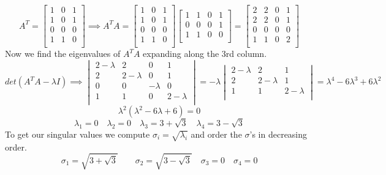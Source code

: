 \documentclass{article}
\begin{document}
$$A^T
=
\begin{bmatrix}
1 & 0 & 1 \\
1 & 0 & 1 \\
0 & 0 & 0 \\
1 & 1 & 0 \\
\end{bmatrix}
\implies
A^TA
=
\begin{bmatrix}
1 & 0 & 1 \\
1 & 0 & 1 \\
0 & 0 & 0 \\
1 & 1 & 0 \\
\end{bmatrix}
\begin{bmatrix}
1 & 1 & 0 & 1 \\
0 & 0 & 0 & 1 \\
1 & 1 & 0 & 0 \\
\end{bmatrix}
=
\begin{bmatrix}
2 & 2 & 0 & 1 \\
2 & 2 & 0 & 1 \\
0 & 0 & 0 & 0 \\
1 & 1 & 0 & 2 \\
\end{bmatrix}
$$
Now we find the eigenvalues of $A^TA$ expanding along the 3rd column.
$$
det(A^TA - \lambda I)
\implies
\begin{vmatrix}
2 -\lambda & 2 & 0 & 1 \\
2 & 2 -\lambda & 0 & 1 \\
0 & 0 &  -\lambda & 0 \\
1 & 1 & 0 & 2 -\lambda \\
\end{vmatrix}
=-\lambda
\begin{vmatrix}
2 -\lambda & 2 & 1 \\
2 & 2 -\lambda & 1 \\
1 & 1 & 2 -\lambda \\
\end{vmatrix}
=\lambda ^4-6 \lambda ^3+6 \lambda ^2
$$
$$
\lambda^2 (\lambda ^2 - 6\lambda + 6) = 0
$$
$$\lambda_1 = 0 \quad \lambda_2 = 0 \quad \lambda_3 = 3+\sqrt{3} \quad \lambda_4 = 3-\sqrt{3}$$
To get our singular values we compute $\sigma_i = \sqrt{\lambda_i}$ and order the $\sigma$'s in decreasing order.
$$\sigma_1 = \sqrt{3 + \sqrt{3}} \qquad \sigma_2 = \sqrt{3 - \sqrt{3}} \quad \sigma_3 = 0 \quad \sigma_4 = 0 $$
\end{document}
